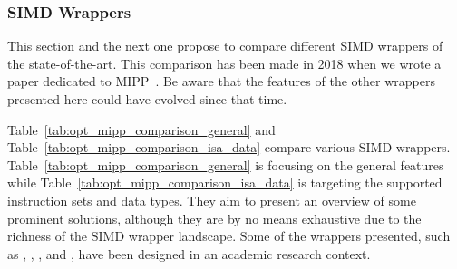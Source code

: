 \subsubsection{\Cxx SIMD Wrappers}

This section and the next one propose to compare different SIMD wrappers of the
state-of-the-art. This comparison has been made in 2018 when we wrote a paper
dedicated to MIPP~\cite{Cassagne2018}. Be aware that the features of the other
wrappers presented here could have evolved since that time.

Table~\ref{tab:opt_mipp_comparison_general} and
Table~\ref{tab:opt_mipp_comparison_isa_data} compare various SIMD wrappers.
Table~\ref{tab:opt_mipp_comparison_general} is focusing on the general features
while Table~\ref{tab:opt_mipp_comparison_isa_data} is targeting the supported
instruction sets and data types. They aim to present an overview of some
prominent solutions, although they are by no means exhaustive due to the
richness of the SIMD wrapper landscape. Some of the wrappers presented, such as
\MIPP, \Vc, \BoostSIMD, \VCL and \TSIMD, have been designed in an academic
research context.

